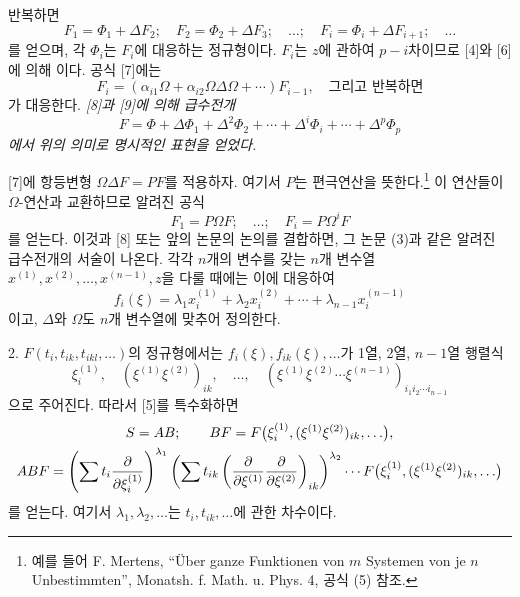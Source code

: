 반복하면
\[
F_1=\Phi_1+\Delta F_2;\quad F_2=\Phi_2+\Delta F_3;\quad\ldots;\quad
F_i=\Phi_i+\Delta F_{i+1};\quad\ldots
\]
를 얻으며, 각 \(\Phi_i\)는 \(F_i\)에 대응하는 정규형이다. \(F_i\)는 \(z\)에 관하여 \(p-i\)차이므로 [4]와 [6]에 의해
이다. 공식 [7]에는
\[
F_i=(\alpha_{i1}\Omega+\alpha_{i2}\Omega\Delta\Omega+\cdots)F_{i-1},
\quad\text{그리고 반복하면}
\]
가 대응한다. \emph{[8]과 [9]에 의해 급수전개}
\[
F=\Phi+\Delta\Phi_1+\Delta^2\Phi_2+\cdots+\Delta^i\Phi_i+\cdots+\Delta^p\Phi_p
\]
\emph{에서 위의 의미로 명시적인 표현을 얻었다.}

[7]에 항등변형 \(\Omega\Delta F=PF\)를 적용하자. 여기서 \(P\)는 편극연산을 뜻한다.\footnote{예를 들어 F. Mertens, ``Über ganze Funktionen von \(m\) Systemen von je \(n\) Unbestimmten'', Monatsh. f. Math. u. Phys. 4, 공식 (5) 참조.} 이 연산들이 \(\Omega\)-연산과 교환하므로 알려진 공식
\[
F_1=P\Omega F;\quad\ldots;\quad F_i=P\Omega^iF
\]
를 얻는다. 이것과 [8] 또는 앞의 논문의 논의를 결합하면, 그 논문 (3)과 같은 알려진 급수전개의 서술이 나온다. 각각 \(n\)개의 변수를 갖는 \(n\)개 변수열 \(x^{(1)},x^{(2)},\ldots,x^{(n-1)},z\)을 다룰 때에는 이에 대응하여
\[
f_i(\xi)=\lambda_1x_i^{(1)}+\lambda_2x_i^{(2)}+\cdots+\lambda_{n-1}x_i^{(n-1)}
\]
이고, \(\Delta\)와 \(\Omega\)도 \(n\)개 변수열에 맞추어 정의한다.

2. \(F(t_i,t_{ik},t_{ikl},\ldots)\)의 정규형에서는 \(f_i(\xi),f_{ik}(\xi),\ldots\)가 1열, 2열, \(n-1\)열 행렬식
\[
\xi_i^{(1)},\quad (\xi^{(1)}\xi^{(2)})_{ik},\quad\ldots,\quad
(\xi^{(1)}\xi^{(2)}\cdots\xi^{(n-1)})_{i_1i_2\cdots i_{n-1}}
\]
으로 주어진다. 따라서 [5]를 특수화하면
\[
\begin{gathered}
S=AB;\qquad
BF=F\bigl(\xi_i^{(1)},(\xi^{(1)}\xi^{(2)})_{ik},\ldots\bigr),\\
ABF=\left(\sum t_i\frac{\partial}{\partial\xi_i^{(1)}}\right)^{\lambda_1}
\left(\sum t_{ik}\left(\frac{\partial}{\partial\xi^{(1)}}\frac{\partial}{\partial\xi^{(2)}}\right)_{ik}\right)^{\lambda_2}
\cdots F\bigl(\xi_i^{(1)},(\xi^{(1)}\xi^{(2)})_{ik},\ldots\bigr)
\end{gathered}
\]
를 얻는다. 여기서 \(\lambda_1,\lambda_2,\ldots\)는 \(t_i,t_{ik},\ldots\)에 관한 차수이다.

